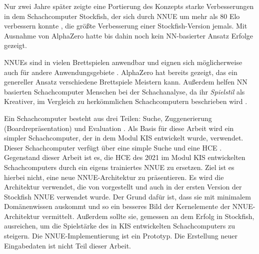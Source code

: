 Nur zwei Jahre später zeigte eine Portierung des Konzepts starke Verbesserungen in dem Schachcomputer Stockfish, der sich durch \ac{NNUE} um mehr als 80 Elo verbessern konnte \cite{StockfishIntroducingNNUE}, die größte Verbesserung einer Stockfish-Version jemals. Mit Ausnahme von AlphaZero \cite{Silver2017} hatte bis dahin noch kein \ac{NN}-basierter Ansatz Erfolge gezeigt.

\acp{NNUE} sind in vielen Brettspielen anwendbar und eignen sich möglicherweise auch für andere Anwendungsgebiete \cite{StockfishNNUE}. AlphaZero \cite{Silver2017} hat bereits gezeigt, das ein genereller Ansatz verschiedene Brettspiele Meistern kann. Außerdem helfen \ac{NN} basierten Schachcomputer Menschen bei der Schachanalyse, da ihr \emph{Spielstil} als Kreativer, im Vergleich zu herkömmlichen Schachcomputern beschrieben wird \cite{Kasparov2018}.

Ein Schachcomputer besteht aus drei Teilen: Suche, Zuggenerierung (Boardrepräsentation) und Evaluation \cite{VazquezFernandez2013}. Als Basis für diese Arbeit wird ein simpler Schachcomputer, der in dem Modul \ac{KIS} entwickelt wurde, verwendet. Dieser Schachcomputer verfügt über eine simple Suche und eine \ac{HCE} \cite{nopy}. Gegenstand dieser Arbeit ist es, die \ac{HCE} des 2021 im Modul \ac{KIS} entwickelten Schachcomputers durch ein eigens trainiertes \ac{NNUE} zu ersetzen. Ziel ist es hierbei nicht, eine neue \ac{NNUE}-Architektur zu präsentieren. Es wird die Architektur verwendet, die von \citeauthor{YNasu2018} \cite{YNasu2018} vorgestellt und auch in der ersten Version der Stockfish \ac{NNUE} verwendet wurde. Der Grund dafür ist, dass sie mit minimalem Domänenwissen auskommt und so ein besseres Bild der Kernelemente der \ac{NNUE}-Architektur vermittelt. Außerdem sollte sie, gemessen an dem Erfolg in Stockfish, ausreichen, um die Spielstärke des in \ac{KIS} entwickelten Schachcomputers zu steigern. Die \ac{NNUE}-Implementierung ist ein Prototyp. Die Erstellung neuer Eingabedaten ist nicht Teil dieser Arbeit.